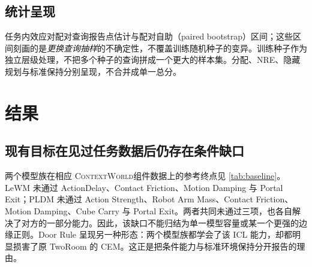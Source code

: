 \documentclass[UTF8,zihao=-4,fontset=fandol]{ctexart}
\newcommand{\benchmark}{\textsc{ContextWorld}}
\begin{document}
\subsection{统计呈现}

任务内效应对配对查询报告点估计与配对自助（paired bootstrap）区间；这些区间刻画的是\emph{更换查询抽样}的不确定性，不覆盖训练随机种子的变异。训练种子作为独立层级处理，不把多个种子的查询拼成一个更大的样本集。分配、NRE、隐藏规划与标准保持分别呈现，不合并成单一总分。

\section{结果}
\label{sec:results}

\subsection{现有目标在见过任务数据后仍存在条件缺口}
\label{sec:gap}

两个模型族在相应 \benchmark 组件数据上的参考终点见 \cref{tab:baseline}。LeWM 未通过 ActionDelay、Contact Friction、Motion Damping 与 Portal Exit；PLDM 未通过 Action Strength、Robot Arm Mass、Contact Friction、Motion Damping、Cube Carry 与 Portal Exit。两者共同未通过三项，也各自解决了对方的一部分能力。因此，该缺口不能归结为单一模型容量或某一个更强的边缘正则。Door Rule 呈现另一种形态：两个模型族都学会了该 ICL 能力，却都明显损害了原 TwoRoom 的 CEM。这正是把条件能力与标准环境保持分开报告的理由。
\end{document}
